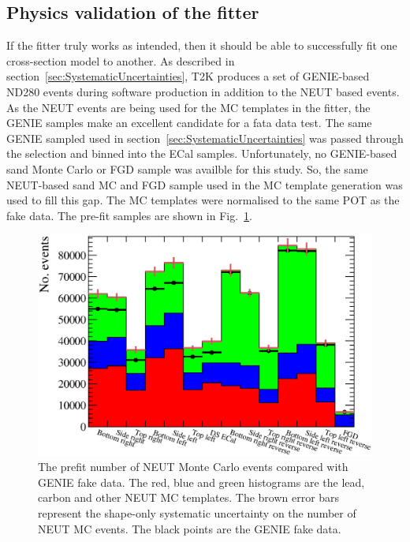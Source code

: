 \subsection{Physics validation of the fitter}
\label{subsec:PhysicsFitterValidation}
If the fitter truly works as intended, then it should be able to successfully fit one cross-section model to another.  As described in section~\ref{sec:SystematicUncertainties}, T2K produces a set of GENIE-based ND280 events during software production in addition to the NEUT based events.  As the NEUT events are being used for the MC templates in the fitter, the GENIE samples make an excellent candidate for a fata data test.
\newline
\newline 
The same GENIE sampled used in section~\ref{sec:SystematicUncertainties} was passed through the selection and binned into the ECal samples.  Unfortunately, no GENIE-based sand Monte Carlo or FGD sample was availble for this study.  So, the same NEUT-based sand MC and FGD sample used in the MC template generation was used to fill this gap.  The MC templates were normalised to the same POT as the fake data.  The pre-fit samples are shown in Fig.~\ref{fig:MCTemplatesWithSystematicsGenieDataPreFit}.
\begin{figure}
  \centering
  \includegraphics[width=15cm]{images/measurement/validation/genie/MCTemplatesWithSystematics_GenieData_PreFit.eps}
  \caption{The prefit number of NEUT Monte Carlo events compared with GENIE fake data.  The red, blue and green histograms are the lead, carbon and other NEUT MC templates.  The brown error bars represent the shape-only systematic uncertainty on the number of NEUT MC events.  The black points are the GENIE fake data.}
  \label{fig:MCTemplatesWithSystematicsGenieDataPreFit}
\end{figure}
